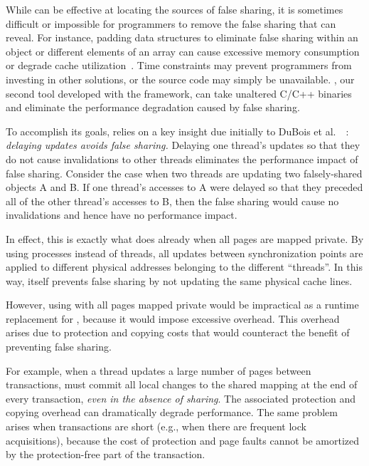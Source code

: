 \label{sec:patrol}

While \sheriffdetect{} can be effective at locating the sources of
false sharing, it is sometimes difficult or impossible for programmers
to remove the false sharing that \sheriffdetect{} can reveal. For
instance, padding data structures to eliminate false sharing within an
object or different elements of an array can cause excessive memory
consumption or degrade cache utilization~\cite{zhao:vee:2011}. Time
constraints may prevent programmers from investing in other solutions,
or the source code may simply be unavailable. \sheriffprotect{}, our
second tool developed with the \sheriff{} framework, can take
unaltered C/C++ binaries and eliminate the performance degradation
caused by false sharing.

To accomplish its goals, \sheriffprotect{} relies on a key insight
due initially to DuBois et al.\
~\cite{Dubois:1991:DCE:125826.125941}: \emph{delaying updates avoids
  false sharing.}  Delaying one thread's updates
so that they do not cause invalidations to other threads 
eliminates the performance impact of false sharing. Consider the case when
two threads are updating two falsely-shared objects A and B. If one
thread's accesses to A were delayed so that they preceded all of the
other thread's accesses to B, then the false sharing would cause no
invalidations and hence have no performance impact.

In effect, this is exactly what \sheriff{} does already when all pages
are mapped private. By using processes instead of threads, all updates
between synchronization points are applied to different physical addresses
belonging to the different ``threads''. In this way, \sheriff{} itself
prevents false sharing by not updating the same physical cache
lines.

However, using \sheriff{} with all pages mapped private would be impractical as a runtime
replacement for \pthreads{}, because it would impose excessive overhead.
This overhead arises due to 
protection and copying costs that would counteract the benefit of
preventing false sharing.

For example, when a thread updates a large number of pages between
transactions, \sheriff{} must commit all local changes to the shared
mapping at the end of every transaction, \emph{even in the absence of
  sharing}. The associated protection and copying overhead can
dramatically degrade performance. The same problem arises when transactions are
short (e.g., when there are frequent lock acquisitions), because the
cost of protection and page faults cannot be amortized by the
protection-free part of the transaction.

